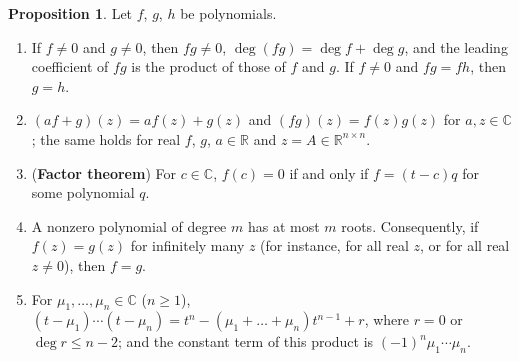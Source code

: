 \documentclass[12pt]{article}
\newcommand{\R}{\mathbb R}
\theoremstyle{definition}
\newtheorem{proposition}[theorem]{Proposition}
\begin{document}
\begin{proposition}\label{r7-prop-poly}
Let \(f\), \(g\), \(h\) be polynomials.
\begin{enumerate}
\item If \(f\ne0\) and \(g\ne0\), then \(fg\ne0\), \(\deg(fg)=\deg f+\deg g\), and the leading coefficient of \(fg\) is the
product of those of \(f\) and \(g\). If \(f\ne0\) and \(fg=fh\), then \(g=h\).
\item \((af+g)(z)=af(z)+g(z)\) and \((fg)(z)=f(z)g(z)\) for \(a,z\in\mathbb C\); the same holds for real \(f\), \(g\),
\(a\in\R\) and \(z=A\in\R^{n\times n}\).
\item (\textbf{Factor theorem}) For \(c\in\mathbb C\), \(f(c)=0\) if and only if \(f=(t-c)q\) for some polynomial \(q\).
\item A nonzero polynomial of degree \(m\) has at most \(m\) roots. Consequently, if \(f(z)=g(z)\) for infinitely many
\(z\) (for instance, for all real \(z\), or for all real \(z\ne0\)), then \(f=g\).
\item For \(\mu_1,\dots,\mu_n\in\mathbb C\) (\(n\geqslant1\)),
\((t-\mu_1)\cdots(t-\mu_n)=t^n-(\mu_1+\dots+\mu_n)t^{n-1}+r\), where \(r=0\) or \(\deg r\leqslant n-2\); and the constant
term of this product is \((-1)^n\mu_1\cdots\mu_n\).
\end{enumerate}
\end{proposition}
\end{document}
